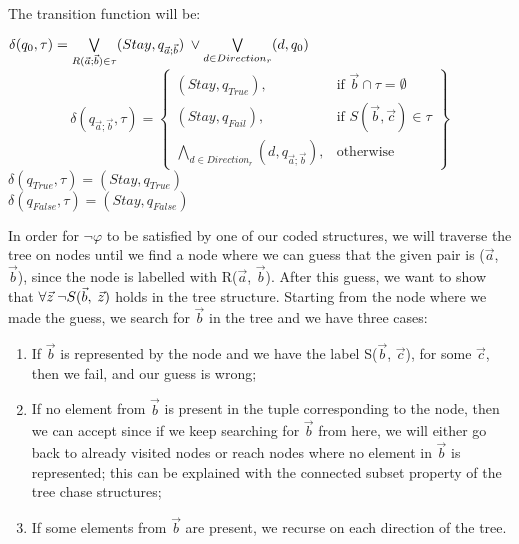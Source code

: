 \documentclass[11pt, a4paper, dvipsnames]{article}
\begin{document}
The transition function will be:
\begin{center}
$\delta(q_{0}, \tau) = \bigvee\limits_{R(\vec{a};\vec{b}) \in \tau} (Stay, q_{\vec{a};\vec{b}})\hspace{0.25em} \vee \bigvee\limits_{d \in Direction_{r}} (d, q_{0})$
\[\delta(q_{\vec{a}; \vec{b}}, \tau) = \left\{\begin{array}{lr}
        (Stay, q_{True}), & \text{if }\vec{b} \cap \tau = \emptyset \\
        (Stay, q_{Fail}), & \text{if } S(\vec{b}, \vec{c}) \in \tau \\
        \bigwedge\limits_{d \in Direction_{r}} (d, q_{\vec{a}; \vec{b}}), & \text{otherwise}
        \end{array}\right\}
  \] 
$\delta(q_{True}, \tau) = (Stay, q_{True})$\\
$\delta(q_{False}, \tau) = (Stay, q_{False})$
\end{center}
In order for $\neg \varphi$ to be satisfied by one of our coded structures, we will traverse the tree on nodes until we find a node where we can guess that the given pair is ($\vec{a}$, $\vec{b}$), since the node is labelled with R($\vec{a}$, $\vec{b}$). After this guess, we want to show that $\forall \vec{z} \hspace{0.25em} \neg S(\vec{b}, \hspace{0.25em} \vec{z})$ holds in the tree structure. Starting from the node where we made the guess, we search for $\vec{b}$ in the tree and we have three cases:
\begin{enumerate}
	\item If $\vec{b}$ is represented by the node and we have the label S($\vec{b}$, $\vec{c}$), for some $\vec{c}$, then we fail, and our guess is wrong;
	\item If no element from $\vec{b}$ is present in the tuple corresponding to the node, then we can accept since if we keep searching for $\vec{b}$  from here, we will either go back to already visited nodes or reach nodes where no element in $\vec{b}$ is represented; this can be explained with the connected subset property of the tree chase structures;
	\item If some elements from $\vec{b}$ are present, we recurse on each direction of the tree.
\end{enumerate}
\end{document}
